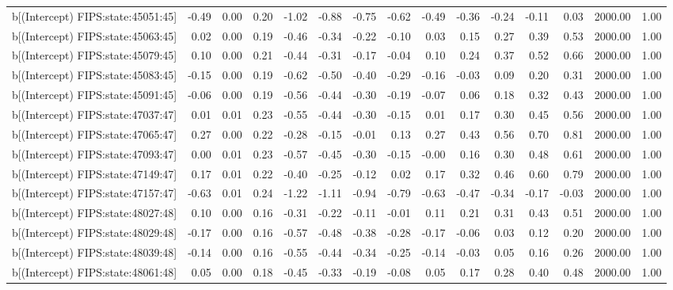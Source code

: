 \begin{table}[ht]
\begin{tabular}{rrrrrrrrrrrrrrr}
  b[(Intercept) FIPS:state:45051:45] & -0.49 & 0.00 & 0.20 & -1.02 & -0.88 & -0.75 & -0.62 & -0.49 & -0.36 & -0.24 & -0.11 & 0.03 & 2000.00 & 1.00 \\ 
  b[(Intercept) FIPS:state:45063:45] & 0.02 & 0.00 & 0.19 & -0.46 & -0.34 & -0.22 & -0.10 & 0.03 & 0.15 & 0.27 & 0.39 & 0.53 & 2000.00 & 1.00 \\ 
  b[(Intercept) FIPS:state:45079:45] & 0.10 & 0.00 & 0.21 & -0.44 & -0.31 & -0.17 & -0.04 & 0.10 & 0.24 & 0.37 & 0.52 & 0.66 & 2000.00 & 1.00 \\ 
  b[(Intercept) FIPS:state:45083:45] & -0.15 & 0.00 & 0.19 & -0.62 & -0.50 & -0.40 & -0.29 & -0.16 & -0.03 & 0.09 & 0.20 & 0.31 & 2000.00 & 1.00 \\ 
  b[(Intercept) FIPS:state:45091:45] & -0.06 & 0.00 & 0.19 & -0.56 & -0.44 & -0.30 & -0.19 & -0.07 & 0.06 & 0.18 & 0.32 & 0.43 & 2000.00 & 1.00 \\ 
  b[(Intercept) FIPS:state:47037:47] & 0.01 & 0.01 & 0.23 & -0.55 & -0.44 & -0.30 & -0.15 & 0.01 & 0.17 & 0.30 & 0.45 & 0.56 & 2000.00 & 1.00 \\ 
  b[(Intercept) FIPS:state:47065:47] & 0.27 & 0.00 & 0.22 & -0.28 & -0.15 & -0.01 & 0.13 & 0.27 & 0.43 & 0.56 & 0.70 & 0.81 & 2000.00 & 1.00 \\ 
  b[(Intercept) FIPS:state:47093:47] & 0.00 & 0.01 & 0.23 & -0.57 & -0.45 & -0.30 & -0.15 & -0.00 & 0.16 & 0.30 & 0.48 & 0.61 & 2000.00 & 1.00 \\ 
  b[(Intercept) FIPS:state:47149:47] & 0.17 & 0.01 & 0.22 & -0.40 & -0.25 & -0.12 & 0.02 & 0.17 & 0.32 & 0.46 & 0.60 & 0.79 & 2000.00 & 1.00 \\ 
  b[(Intercept) FIPS:state:47157:47] & -0.63 & 0.01 & 0.24 & -1.22 & -1.11 & -0.94 & -0.79 & -0.63 & -0.47 & -0.34 & -0.17 & -0.03 & 2000.00 & 1.00 \\ 
  b[(Intercept) FIPS:state:48027:48] & 0.10 & 0.00 & 0.16 & -0.31 & -0.22 & -0.11 & -0.01 & 0.11 & 0.21 & 0.31 & 0.43 & 0.51 & 2000.00 & 1.00 \\ 
  b[(Intercept) FIPS:state:48029:48] & -0.17 & 0.00 & 0.16 & -0.57 & -0.48 & -0.38 & -0.28 & -0.17 & -0.06 & 0.03 & 0.12 & 0.20 & 2000.00 & 1.00 \\ 
  b[(Intercept) FIPS:state:48039:48] & -0.14 & 0.00 & 0.16 & -0.55 & -0.44 & -0.34 & -0.25 & -0.14 & -0.03 & 0.05 & 0.16 & 0.26 & 2000.00 & 1.00 \\ 
  b[(Intercept) FIPS:state:48061:48] & 0.05 & 0.00 & 0.18 & -0.45 & -0.33 & -0.19 & -0.08 & 0.05 & 0.17 & 0.28 & 0.40 & 0.48 & 2000.00 & 1.00 \\ 

\end{tabular}
\end{table}
